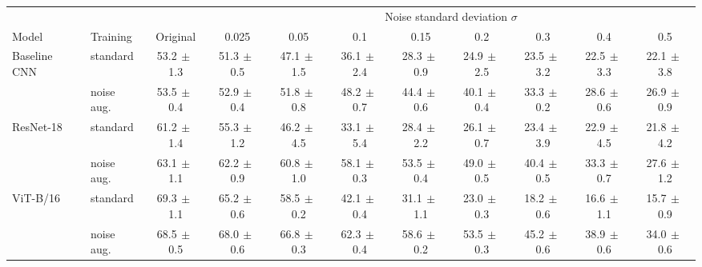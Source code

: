 \begin{tabular}{llccccccccc}
\toprule
 & & & \multicolumn{8}{c}{Noise standard deviation $\sigma$} \\
\cmidrule(lr){4-11}
Model & Training & Original & 0.025 & 0.05 & 0.1 & 0.15 & 0.2 & 0.3 & 0.4 & 0.5 \\
\midrule
Baseline CNN & standard & 53.2{\scriptsize$\,\pm\,$1.3} & 51.3{\scriptsize$\,\pm\,$0.5} & 47.1{\scriptsize$\,\pm\,$1.5} & 36.1{\scriptsize$\,\pm\,$2.4} & 28.3{\scriptsize$\,\pm\,$0.9} & 24.9{\scriptsize$\,\pm\,$2.5} & 23.5{\scriptsize$\,\pm\,$3.2} & 22.5{\scriptsize$\,\pm\,$3.3} & 22.1{\scriptsize$\,\pm\,$3.8} \\
 & noise aug. & 53.5{\scriptsize$\,\pm\,$0.4} & 52.9{\scriptsize$\,\pm\,$0.4} & 51.8{\scriptsize$\,\pm\,$0.8} & 48.2{\scriptsize$\,\pm\,$0.7} & 44.4{\scriptsize$\,\pm\,$0.6} & 40.1{\scriptsize$\,\pm\,$0.4} & 33.3{\scriptsize$\,\pm\,$0.2} & 28.6{\scriptsize$\,\pm\,$0.6} & 26.9{\scriptsize$\,\pm\,$0.9} \\
\addlinespace
ResNet-18 & standard & 61.2{\scriptsize$\,\pm\,$1.4} & 55.3{\scriptsize$\,\pm\,$1.2} & 46.2{\scriptsize$\,\pm\,$4.5} & 33.1{\scriptsize$\,\pm\,$5.4} & 28.4{\scriptsize$\,\pm\,$2.2} & 26.1{\scriptsize$\,\pm\,$0.7} & 23.4{\scriptsize$\,\pm\,$3.9} & 22.9{\scriptsize$\,\pm\,$4.5} & 21.8{\scriptsize$\,\pm\,$4.2} \\
 & noise aug. & 63.1{\scriptsize$\,\pm\,$1.1} & 62.2{\scriptsize$\,\pm\,$0.9} & 60.8{\scriptsize$\,\pm\,$1.0} & 58.1{\scriptsize$\,\pm\,$0.3} & 53.5{\scriptsize$\,\pm\,$0.4} & 49.0{\scriptsize$\,\pm\,$0.5} & 40.4{\scriptsize$\,\pm\,$0.5} & 33.3{\scriptsize$\,\pm\,$0.7} & 27.6{\scriptsize$\,\pm\,$1.2} \\
\addlinespace
ViT-B/16 & standard & 69.3{\scriptsize$\,\pm\,$1.1} & 65.2{\scriptsize$\,\pm\,$0.6} & 58.5{\scriptsize$\,\pm\,$0.2} & 42.1{\scriptsize$\,\pm\,$0.4} & 31.1{\scriptsize$\,\pm\,$1.1} & 23.0{\scriptsize$\,\pm\,$0.3} & 18.2{\scriptsize$\,\pm\,$0.6} & 16.6{\scriptsize$\,\pm\,$1.1} & 15.7{\scriptsize$\,\pm\,$0.9} \\
 & noise aug. & 68.5{\scriptsize$\,\pm\,$0.5} & 68.0{\scriptsize$\,\pm\,$0.6} & 66.8{\scriptsize$\,\pm\,$0.3} & 62.3{\scriptsize$\,\pm\,$0.4} & 58.6{\scriptsize$\,\pm\,$0.2} & 53.5{\scriptsize$\,\pm\,$0.3} & 45.2{\scriptsize$\,\pm\,$0.6} & 38.9{\scriptsize$\,\pm\,$0.6} & 34.0{\scriptsize$\,\pm\,$0.6} \\
\bottomrule
\end{tabular}

